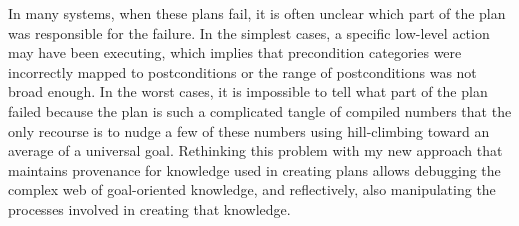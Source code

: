 In many systems, when these plans fail, it is often unclear which part
of the plan was responsible for the failure.  In the simplest cases, a
specific low-level action may have been executing, which implies that
precondition categories were incorrectly mapped to postconditions or
the range of postconditions was not broad enough.  In the worst cases,
it is impossible to tell what part of the plan failed because the plan
is such a complicated tangle of compiled numbers that the only
recourse is to nudge a few of these numbers using hill-climbing toward
an average of a universal goal.  Rethinking this problem with my new
approach that maintains provenance for knowledge used in creating
plans allows debugging the complex web of goal-oriented knowledge, and
reflectively, also manipulating the processes involved in creating
that knowledge.



